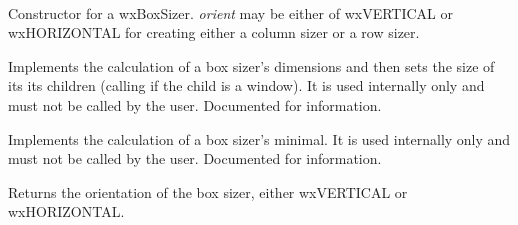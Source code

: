 
\\

\label{wxboxsizerwxboxsizer}


Constructor for a wxBoxSizer. {\it orient} may be either of wxVERTICAL
or wxHORIZONTAL for creating either a column sizer or a row sizer.

\label{wxboxsizerrecalcsizes}


Implements the calculation of a box sizer's dimensions and then sets
the size of its its children (calling  
if the child is a window). It is used internally only and must not be called
by the user. Documented for information.

\label{wxboxsizercalcmin}


Implements the calculation of a box sizer's minimal. It is used internally
only and must not be called by the user. Documented for information.

\label{wxboxsizergetorientation}


Returns the orientation of the box sizer, either wxVERTICAL
or wxHORIZONTAL.

